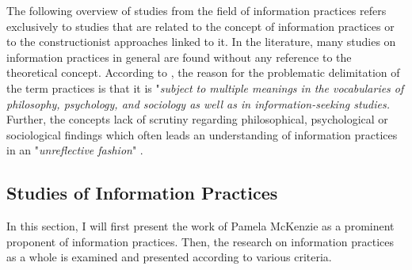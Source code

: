\documentclass[12pt, a4paper, titlepage, oneside, abstract=true, toc=listof, toc=bibliography, BCOR=1cm]{scrreprt}
\begin{document}
The following overview of studies from the field of information practices refers exclusively to studies that are related to the concept of information practices \citep{Savolainen2007} or to the constructionist approaches \citep{Talja2005} linked to it. In the literature, many studies on information practices in general are found without any reference to the theoretical concept. According to \citet[p. 126]{Savolainen2007}, the reason for the problematic delimitation of the term practices is that it is "\textit{subject to multiple meanings in the vocabularies of philosophy, psychology, and sociology as well as in information-seeking studies.} Further, the concepts lack of scrutiny regarding philosophical, psychological or sociological findings which often leads an understanding of information practices in an "\textit{unreflective fashion}" \citep[p. 126]{Savolainen2007}.


\subsection{Studies of Information Practices}



In this section, I will first present the work of Pamela McKenzie as a prominent proponent of information practices. Then, the research on information practices as a whole is examined and presented according to various criteria.
\end{document}
